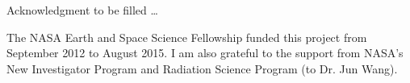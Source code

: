 \begin{acknowledgments}
  Acknowledgment to be filled \ldots
\end{acknowledgments}

\begin{grantinfo}
  The NASA Earth and Space Science Fellowship funded this project from September
  2012 to August 2015. I am also grateful to the support
  from NASA's New Investigator Program and Radiation Science Program
  (to Dr. Jun Wang).
\end{grantinfo}
